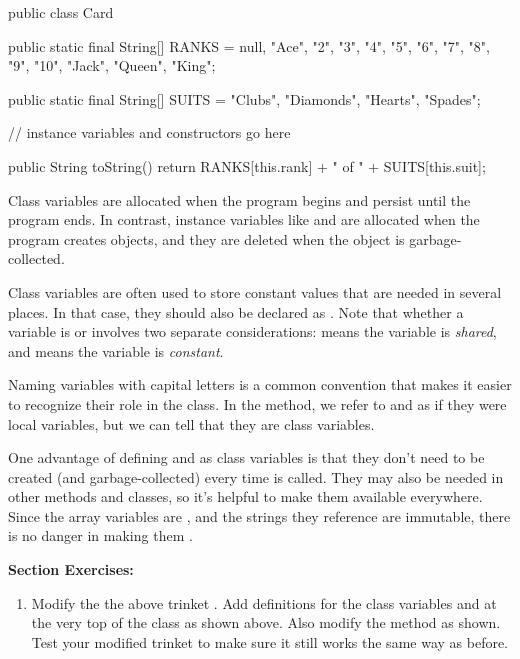 \begin{code}
public class Card {

    public static final String[] RANKS = {
        null, "Ace", "2", "3", "4", "5", "6", "7",
        "8", "9", "10", "Jack", "Queen", "King"};

    public static final String[] SUITS = {
        "Clubs", "Diamonds", "Hearts", "Spades"};

    // instance variables and constructors go here

    public String toString() {
        return RANKS[this.rank] + " of " + SUITS[this.suit];
    }
}
\end{code}


Class variables are allocated when the program begins and persist until the program ends.
In contrast, instance variables like  and  are allocated when the program creates  objects, and they are deleted when the object is garbage-collected.



Class variables are often used to store constant values that are needed in several places.
In that case, they should also be declared as .
Note that whether a variable is  or  involves two separate considerations:
 means the variable is {\em shared}, and  means the variable is {\em constant}.

Naming  variables with capital letters is a common convention that makes it easier to recognize their role in the class.
In the  method, we refer to  and  as if they were local variables, but we can tell that they are class variables.

One advantage of defining  and  as class variables is that they don't need to be created (and garbage-collected) every time  is called.
They may also be needed in other methods and classes, so it's helpful to make them available everywhere.
Since the array variables are , and the strings they reference are immutable, there is no danger in making them .

\textbf{Section Exercises:}
\begin{enumerate}
\item Modify the the above trinket .  Add definitions for the class variables  and  at the very top of the  class as shown above.  Also modify the  method as shown.  Test your modified trinket to make sure it still works the same way as before.
\end{enumerate}


